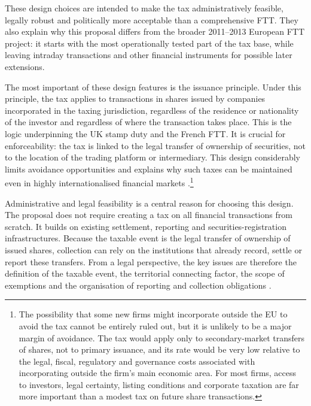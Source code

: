 \documentclass[../../main]{subfiles}
\begin{document}
These design choices are intended to make the tax administratively feasible, legally robust and politically more acceptable than a comprehensive FTT. They also explain why this proposal differs from the broader 2011--2013 European FTT project: it starts with the most operationally tested part of the tax base, while leaving intraday transactions and other financial instruments for possible later extensions.


The most important of these design features is the issuance principle. Under this principle, the tax applies to transactions in shares issued by companies incorporated in the taxing jurisdiction, regardless of the residence or nationality of the investor and regardless of where the transaction takes place. This is the logic underpinning the UK stamp duty and the French FTT. It is crucial for enforceability: the tax is linked to the legal transfer of ownership of securities, not to the location of the trading platform or intermediary. This design considerably limits avoidance opportunities and explains why such taxes can be maintained even in highly internationalised financial markets \citep{CapelleBlancardPersaud2025}.\footnote{The possibility that some new firms might incorporate outside the EU to avoid the tax cannot be entirely ruled out, but it is unlikely to be a major margin of avoidance. The tax would apply only to secondary-market transfers of shares, not to primary issuance, and its rate would be very low relative to the legal, fiscal, regulatory and governance costs associated with incorporating outside the firm's main economic area. For most firms, access to investors, legal certainty, listing conditions and corporate taxation are far more important than a modest tax on future share transactions.}


Administrative and legal feasibility is a central reason for choosing this design. The proposal does not require creating a tax on all financial transactions from scratch. It builds on existing settlement, reporting and securities-registration infrastructures. Because the taxable event is the legal transfer of ownership of issued shares, collection can rely on the institutions that already record, settle or report these transfers. From a legal perspective, the key issues are therefore the definition of the taxable event, the territorial connecting factor, the scope of exemptions and the organisation of reporting and collection obligations \citep{Correia2025}.
\end{document}
